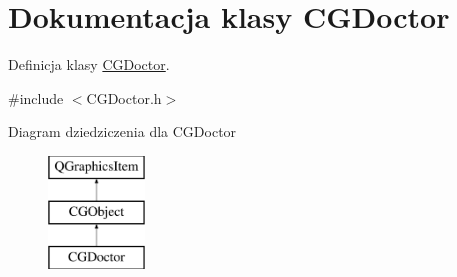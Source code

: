 \hypertarget{class_c_g_doctor}{}\section{Dokumentacja klasy C\+G\+Doctor}
\label{class_c_g_doctor}


Definicja klasy \mbox{\hyperlink{class_c_g_doctor}{C\+G\+Doctor}}.  




{\ttfamily \#include $<$C\+G\+Doctor.\+h$>$}

Diagram dziedziczenia dla C\+G\+Doctor\begin{figure}[H]
\begin{center}
\leavevmode
\includegraphics[height=3.000000cm]{class_c_g_doctor}
\end{center}
\end{figure}

